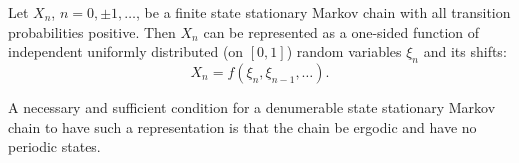 Let $X_n$, $n = 0, \pm 1, \ldots$, be a finite state stationary Markov chain with all transition probabilities positive. Then $X_n$ can be represented as a one-sided function of independent uniformly distributed (on $[0,1]$) random variables $\xi_n$ and its shifts:
$$X_n = f(\xi_n, \xi_{n-1}, \ldots).$$

A necessary and sufficient condition for a denumerable state stationary Markov chain to have such a representation is that the chain be ergodic and have no periodic states.
